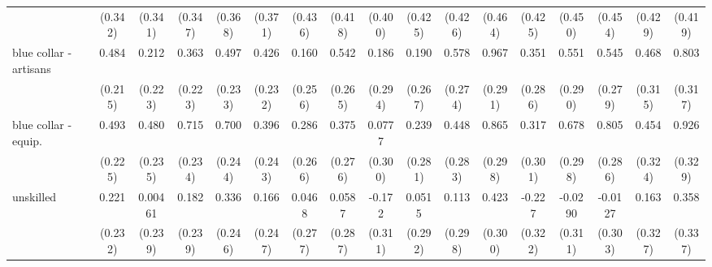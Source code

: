 {\begin{tabular}{l*{16}{c}}
                    &     (0.342)         &     (0.341)         &     (0.347)         &     (0.368)         &     (0.371)         &     (0.436)         &     (0.418)         &     (0.400)         &     (0.425)         &     (0.426)         &     (0.464)         &     (0.425)         &     (0.450)         &     (0.454)         &     (0.429)         &     (0.419)         \\
[1em]
blue collar - artisans&       0.484\sym{*}  &       0.212         &       0.363         &       0.497\sym{*}  &       0.426         &       0.160         &       0.542\sym{*}  &       0.186         &       0.190         &       0.578\sym{*}  &       0.967\sym{***}&       0.351         &       0.551         &       0.545         &       0.468         &       0.803\sym{*}  \\
                    &     (0.215)         &     (0.223)         &     (0.223)         &     (0.233)         &     (0.232)         &     (0.256)         &     (0.265)         &     (0.294)         &     (0.267)         &     (0.274)         &     (0.291)         &     (0.286)         &     (0.290)         &     (0.279)         &     (0.315)         &     (0.317)         \\
[1em]
blue collar - equip.&       0.493\sym{*}  &       0.480\sym{*}  &       0.715\sym{**} &       0.700\sym{**} &       0.396         &       0.286         &       0.375         &      0.0777         &       0.239         &       0.448         &       0.865\sym{**} &       0.317         &       0.678\sym{*}  &       0.805\sym{**} &       0.454         &       0.926\sym{**} \\
                    &     (0.225)         &     (0.235)         &     (0.234)         &     (0.244)         &     (0.243)         &     (0.266)         &     (0.276)         &     (0.300)         &     (0.281)         &     (0.283)         &     (0.298)         &     (0.301)         &     (0.298)         &     (0.286)         &     (0.324)         &     (0.329)         \\
[1em]
unskilled           &       0.221         &     0.00461         &       0.182         &       0.336         &       0.166         &      0.0468         &      0.0587         &      -0.172         &      0.0515         &       0.113         &       0.423         &      -0.227         &     -0.0290         &     -0.0127         &       0.163         &       0.358         \\
                    &     (0.232)         &     (0.239)         &     (0.239)         &     (0.246)         &     (0.247)         &     (0.277)         &     (0.287)         &     (0.311)         &     (0.292)         &     (0.298)         &     (0.300)         &     (0.322)         &     (0.311)         &     (0.303)         &     (0.327)         &     (0.337)         \\

\end{tabular}}
